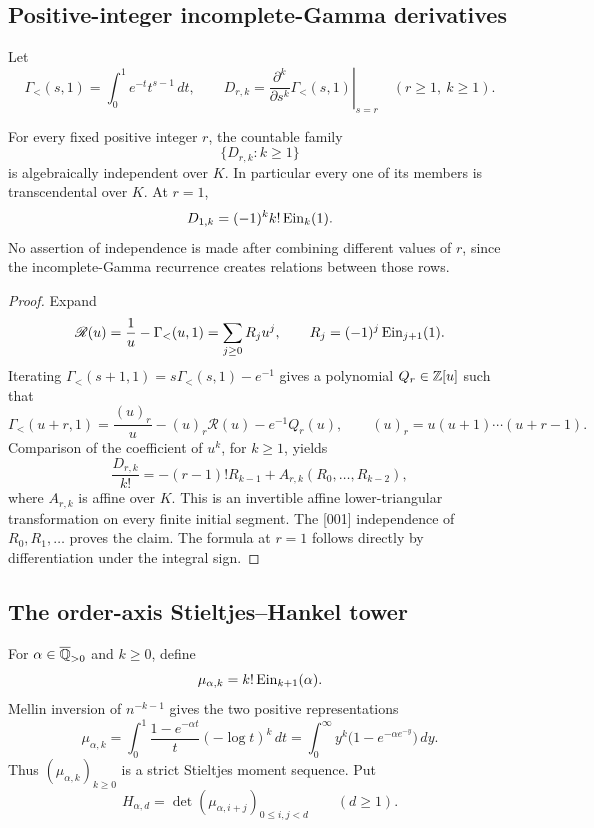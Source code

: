 \subsection{Positive-integer incomplete-Gamma derivatives}

Let
\[
 \Gamma_{<}(s,1)=\int_0^1e^{-t}t^{s-1}\,dt,
 \qquad
 D_{r,k}=\left.\frac{\partial^k}{\partial s^k}
 \Gamma_{<}(s,1)\right|_{s=r}
 \quad(r\ge1,\ k\ge1).
\]

\begin{theorem}
\label{thm:transfer-incomplete-gamma-derivatives}
For every fixed positive integer \(r\), the countable family
\[
 \{D_{r,k}:k\ge1\}
\]
is algebraically independent over \(K\).  In particular every one of its
members is transcendental over \(K\).  At \(r=1\),
\[
 D_{1,k}=(-1)^k k!\operatorname{Ein}_k(1).
\]
No assertion of independence is made after combining different values of
\(r\), since the incomplete-Gamma recurrence creates relations between
those rows.
\end{theorem}

\begin{proof}
Expand
\[
 \mathscr R(u)=\frac1u-\Gamma_{<}(u,1)
 =\sum_{j\ge0}R_ju^j,
 \qquad R_j=(-1)^j\operatorname{Ein}_{j+1}(1).
\]
Iterating
\(\Gamma_{<}(s+1,1)=s\Gamma_{<}(s,1)-e^{-1}\) gives a polynomial
\(Q_r\in\mathbb Z[u]\) such that
\[
 \Gamma_{<}(u+r,1)
 =\frac{(u)_r}{u}-(u)_r\mathscr R(u)-e^{-1}Q_r(u),
 \qquad
 (u)_r=u(u+1)\cdots(u+r-1).
\]
Comparison of the coefficient of \(u^k\), for \(k\ge1\), yields
\[
 \frac{D_{r,k}}{k!}
 =-(r-1)!R_{k-1}
 +A_{r,k}(R_0,\ldots,R_{k-2}),
\]
where \(A_{r,k}\) is affine over \(K\).  This is an invertible affine
lower-triangular transformation on every finite initial segment.  The [001]
independence of \(R_0,R_1,\ldots\) proves the claim.  The formula at
\(r=1\) follows directly by differentiation under the integral sign.
\end{proof}

\subsection{The order-axis Stieltjes--Hankel tower}

For \(\alpha\in\overline{\mathbb Q}_{>0}\) and \(k\ge0\), define
\[
 \mu_{\alpha,k}=k!\operatorname{Ein}_{k+1}(\alpha).
\]
Mellin inversion of \(n^{-k-1}\) gives the two positive representations
\begin{equation}
\label{eq:transfer-order-moments}
 \mu_{\alpha,k}
 =\int_0^1\frac{1-e^{-\alpha t}}{t}(-\log t)^k\,dt
 =\int_0^\infty y^k\bigl(1-e^{-\alpha e^{-y}}\bigr)\,dy.
\end{equation}
Thus \((\mu_{\alpha,k})_{k\ge0}\) is a strict Stieltjes moment sequence.
Put
\[
 H_{\alpha,d}=\det(\mu_{\alpha,i+j})_{0\le i,j<d}
 \qquad(d\ge1).
\]

